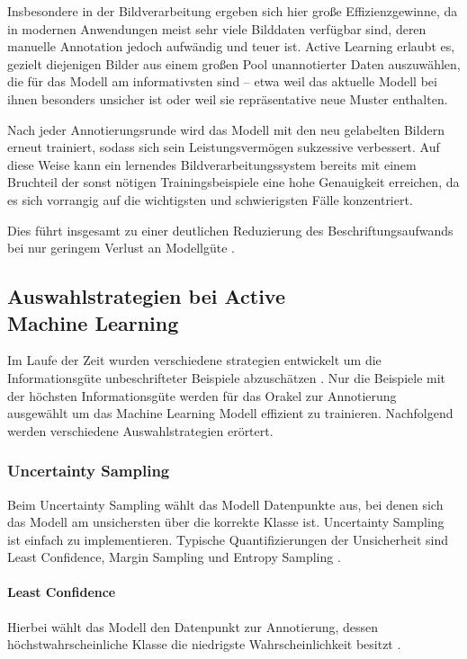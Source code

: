 \documentclass{article}
\begin{document}
Insbesondere in der Bildverarbeitung ergeben sich hier große Effizienzgewinne, da in modernen Anwendungen meist sehr viele Bilddaten verfügbar sind, deren manuelle Annotation jedoch aufwändig und teuer ist. Active Learning erlaubt es, gezielt diejenigen Bilder aus einem großen Pool unannotierter Daten auszuwählen, die für das Modell am informativsten sind – etwa weil das aktuelle Modell bei ihnen besonders unsicher ist oder weil sie repräsentative neue Muster enthalten. 

Nach jeder Annotierungsrunde wird das Modell mit den neu gelabelten Bildern erneut trainiert, sodass sich sein Leistungsvermögen sukzessive verbessert. Auf diese Weise kann ein lernendes Bildverarbeitungssystem bereits mit einem Bruchteil der sonst nötigen Trainingsbeispiele eine hohe Genauigkeit erreichen, da es sich vorrangig auf die wichtigsten und schwierigsten Fälle konzentriert. 

Dies führt insgesamt zu einer deutlichen Reduzierung des Beschriftungsaufwands bei nur geringem Verlust an Modellgüte \cite{Roeder2013}.

	
	
	
	\subsection{Auswahlstrategien bei Active \\Machine Learning}
	Im Laufe der Zeit wurden verschiedene strategien entwickelt um die Informationsgüte unbeschrifteter Beispiele abzuschätzen \cite{Lewis1994}. Nur die Beispiele mit der höchsten Informationsgüte werden für das Orakel zur Annotierung ausgewählt um das Machine Learning Modell effizient zu trainieren. Nachfolgend werden verschiedene Auswahlstrategien erörtert.  
	\subsubsection{Uncertainty Sampling}
	Beim Uncertainty Sampling wählt das Modell Datenpunkte aus, bei denen sich das Modell am unsichersten über die korrekte Klasse ist. Uncertainty Sampling ist einfach zu implementieren. Typische Quantifizierungen der Unsicherheit sind Least Confidence, Margin Sampling und Entropy Sampling \cite{Lewis1994}. 
	
	\paragraph{Least Confidence}
	Hierbei wählt das Modell den Datenpunkt zur Annotierung, dessen höchstwahrscheinliche Klasse die niedrigste Wahrscheinlichkeit besitzt \cite{Settles2008}.
	
\end{document}
